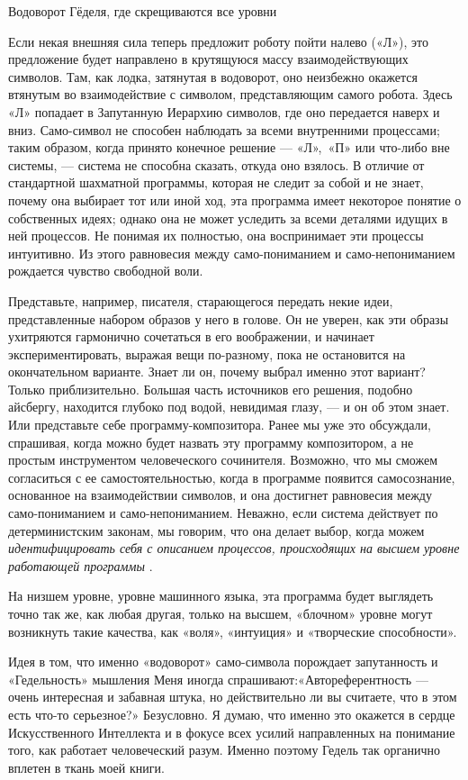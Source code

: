 Водоворот Гёделя, где скрещиваются все уровни

Если некая внешняя сила теперь предложит роботу пойти налево («Л»), это предложение будет направлено в крутящуюся массу взаимодействующих символов. Там, как лодка, затянутая в водоворот, оно неизбежно окажется втянутым во взаимодействие с символом, представляющим самого робота. Здесь «Л» попадает в Запутанную Иерархию символов, где оно передается наверх и вниз. Само-символ не способен наблюдать за всеми внутренними процессами; таким образом, когда принято конечное решение --- «Л»,~«П» или что-либо вне системы, --- система не способна сказать, откуда оно взялось. В отличие от стандартной шахматной программы, которая не следит за собой и не знает, почему она выбирает тот или иной ход, эта программа имеет некоторое понятие о собственных идеях; однако она не может уследить за всеми деталями идущих в ней процессов. Не понимая их полностью, она воспринимает эти процессы интуитивно. Из этого равновесия между само-пониманием и само-непониманием рождается чувство свободной воли.

Представьте, например, писателя, старающегося передать некие идеи, представленные набором образов у него в голове. Он не уверен, как эти образы ухитряются гармонично сочетаться в его воображении, и начинает экспериментировать, выражая вещи по-разному, пока не остановится на окончательном варианте. Знает ли он, почему выбрал именно этот вариант? Только приблизительно. Большая часть источников его решения, подобно айсбергу, находится глубоко под водой, невидимая глазу, --- и он об этом знает. Или представьте себе программу-композитора. Ранее мы уже это обсуждали, спрашивая, когда можно будет назвать эту программу композитором, а не простым инструментом человеческого сочинителя. Возможно, что мы сможем согласиться с ее самостоятельностью, когда в программе появится самосознание, основанное на взаимодействии символов, и она достигнет равновесия между само-пониманием и само-непониманием. Неважно, если система действует по детерминистским законам, мы говорим, что она делает выбор, когда можем \emph{идентифицировать себя с описанием процессов, происходящих на высшем уровне работающей программы} .

На низшем уровне, уровне машинного языка, эта программа будет выглядеть точно так же, как любая другая, только на высшем, «блочном» уровне могут возникнуть такие качества, как «воля», «интуиция» и «творческие способности».

Идея в том, что именно «водоворот» само-символа порождает запутанность и «Гедельность» мышления Меня иногда спрашивают:«Автореферентность --- очень интересная и забавная штука, но действительно ли вы считаете, что в этом есть что-то серьезное?» Безусловно. Я думаю, что именно это окажется в сердце Искусственного Интеллекта и в фокусе всех усилий направленных на понимание того, как работает человеческий разум. Именно поэтому Гедель так органично вплетен в ткань моей книги.

